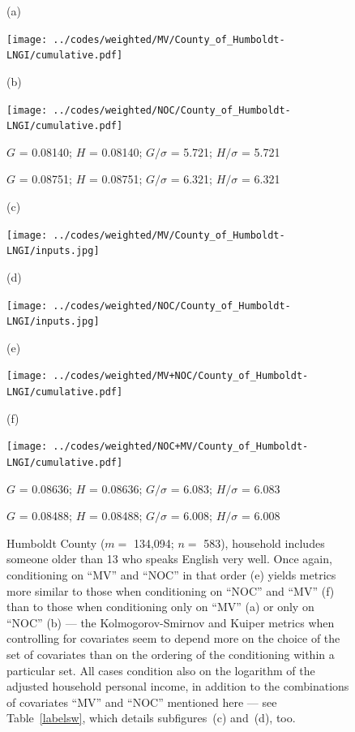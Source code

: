 \documentclass{article}
\newlength{\vertsep}
\newlength{\imsize}
\newlength{\imsized}
\begin{document}
\begin{figure}
\begin{centering}

(a) \parbox{\imsize}{\texttt{[image: ../codes/weighted/MV/County\_of\_Humboldt-LNGI/cumulative.pdf]}}
\quad\quad
(b) \parbox{\imsize}{\texttt{[image: ../codes/weighted/NOC/County\_of\_Humboldt-LNGI/cumulative.pdf]}}

\parbox{\imsized}{\hfil \footnotesize $G$ = 0.08140; $H$ = 0.08140;
$G/\sigma$ = 5.721; $H/\sigma$ = 5.721}
\parbox{\imsized}{\hfil \footnotesize $G$ = 0.08751; $H$ = 0.08751;
$G/\sigma$ = 6.321; $H/\sigma$ = 6.321}

\vspace{\vertsep}

(c) \parbox{\imsize}{\texttt{[image: ../codes/weighted/MV/County\_of\_Humboldt-LNGI/inputs.jpg]}}
\quad\quad
(d) \parbox{\imsize}{\texttt{[image: ../codes/weighted/NOC/County\_of\_Humboldt-LNGI/inputs.jpg]}}

\vspace{\vertsep}

(e) \parbox{\imsize}{\texttt{[image: ../codes/weighted/MV+NOC/County\_of\_Humboldt-LNGI/cumulative.pdf]}}
\quad\quad
(f) \parbox{\imsize}{\texttt{[image: ../codes/weighted/NOC+MV/County\_of\_Humboldt-LNGI/cumulative.pdf]}}

\parbox{\imsized}{\hfil \footnotesize $G$ = 0.08636; $H$ = 0.08636;
$G/\sigma$ = 6.083; $H/\sigma$ = 6.083}
\parbox{\imsized}{\hfil \footnotesize $G$ = 0.08488; $H$ = 0.08488;
$G/\sigma$ = 6.008; $H/\sigma$ = 6.008}

\end{centering}
\caption{Humboldt County ($m =$ 134,094; $n =$ 583),
household includes someone older than 13 who speaks English very well.
Once again, conditioning on ``MV'' and ``NOC'' in that order (e) yields
metrics more similar to those when conditioning on ``NOC'' and ``MV'' (f)
than to those when conditioning only on ``MV'' (a) or only on ``NOC'' (b) ---
the Kolmogorov-Smirnov and Kuiper metrics when controlling
for covariates seem to depend more on the choice
of the set of covariates than on the ordering of the conditioning
within a particular set. All cases condition also on the logarithm
of the adjusted household personal income, in addition to the combinations
of covariates ``MV'' and ``NOC'' mentioned here --- see Table~\ref{labelsw},
which details subfigures~(c) and~(d), too.}
\label{humboldt}
\end{figure}
\end{document}
